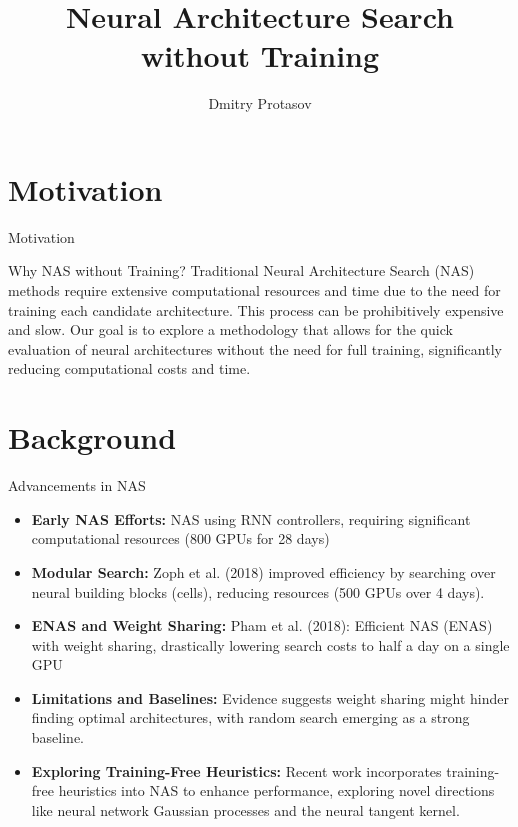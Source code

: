 \documentclass{beamer}
\title{Neural Architecture Search without Training}
\author{Dmitry Protasov}
\institute{MIPT, 2023}
\begin{document}
\begin{frame}
    \titlepage
\end{frame}


\section{Motivation}
\begin{frame}{Motivation}
    \begin{block}{Why NAS without Training?}
        Traditional Neural Architecture Search (NAS) methods require extensive computational resources and time due to the need for training each candidate architecture. This process can be prohibitively expensive and slow. Our goal is to explore a methodology that allows for the quick evaluation of neural architectures without the need for full training, significantly reducing computational costs and time.
    \end{block}
\end{frame}

\section{Background}
\begin{frame}{Advancements in NAS}
\begin{block}{}
    \begin{itemize}
        \item \textbf{Early NAS Efforts:} NAS using RNN controllers, requiring significant computational resources (800 GPUs for 28 days)
        \item \textbf{Modular Search:} Zoph et al. (2018) improved efficiency by searching over neural building blocks (cells), reducing resources (500 GPUs over 4 days).
        \item \textbf{ENAS and Weight Sharing:} Pham et al. (2018): Efficient NAS (ENAS) with weight sharing, drastically lowering search costs to half a day on a single GPU
        \item \textbf{Limitations and Baselines:} Evidence suggests weight sharing might hinder finding optimal architectures, with random search emerging as a strong baseline.
        \item \textbf{Exploring Training-Free Heuristics:} Recent work incorporates training-free heuristics into NAS to enhance performance, exploring novel directions like neural network Gaussian processes and the neural tangent kernel.
    \end{itemize}
\end{block}
\end{frame}
\end{document}
